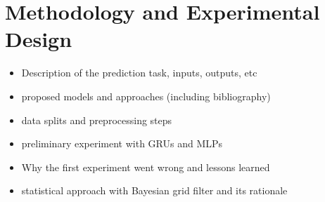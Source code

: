 \chapter{Methodology and Experimental Design}
\begin{itemize}
\item Description of the prediction task, inputs, outputs, etc
\item proposed models and approaches (including bibliography)
\item data splits and preprocessing steps
\item preliminary experiment with GRUs and MLPs
\item Why the first experiment went wrong and lessons learned
\item statistical approach with Bayesian grid filter and its rationale

\end{itemize}